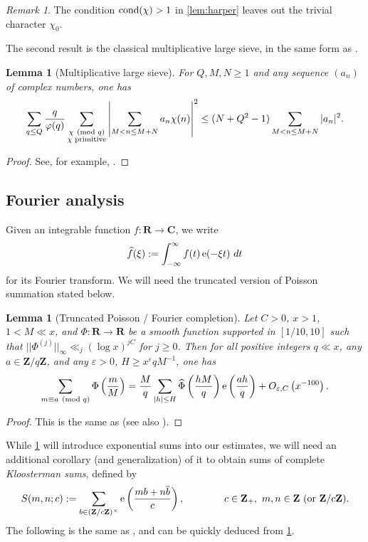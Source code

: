 \documentclass[reqno,11pt]{amsart}
\newtheorem{lemma}[theorem]{Lemma}
\theoremstyle{definition}
\theoremstyle{remark}
\newtheorem*{remark}{Remark}
\numberwithin{equation}{section}
\newcommand{\Z}{\mathbf{Z}}
\newcommand{\R}{\mathbf{R}}
\newcommand{\C}{\mathbf{C}}
\newcommand{\e}{\textnormal{e}}
\newcommand{\eps}{\varepsilon}
\renewcommand{\bar}{\overline}
\renewcommand{\hat}{\widehat}
\newcommand{\cond}{\textnormal{cond}}
\renewcommand{\pmod}[1]{\ (\textnormal{mod } #1)}
\begin{document}
\begin{remark}
The condition $\cond(\chi) > 1$ in \cref{lem:harper} leaves out the trivial character $\chi_0$.
\end{remark}

The second result is the classical multiplicative large sieve, in the same form as \cite[Lemme 6]{drappeau2015theoremes}.

\begin{lemma}[Multiplicative large sieve] \label{lem:large-sieve}
For $Q, M, N \ge 1$ and any sequence $(a_n)$ of complex numbers, one has
\[
    \sum_{q \le Q} \frac{q}{\varphi(q)} \sum_{\substack{\chi \pmod{q} \\ \chi \textnormal{ primitive}}} 
    \left\vert 
    \sum_{M < n \le M+N} a_n \chi(n)
    \right\vert^2
    \le 
    (N + Q^2 - 1) 
    \sum_{M < n \le M+N} |a_n|^2.
\]
\end{lemma}

\begin{proof}
See, for example, \cite[Theorem 7.13]{iwaniec2021analytic}. 
\end{proof}


\subsection{Fourier analysis}
Given an integrable function $f : \R \to \C$, we write
\[
    \hat{f}(\xi) := \int_{-\infty}^\infty f(t)\, \e(-\xi t)\ dt
\]
for its Fourier transform. We will need the truncated version of Poisson summation stated below.

\begin{lemma}[Truncated Poisson / Fourier completion] \label{lem:poisson}
Let $C > 0$, $x > 1$, $1 < M \ll x$, and $\Phi : \R \to \R$ be a smooth function supported in $[1/10, 10]$ such that $||\Phi^{(j)}||_\infty \ll_j (\log x)^{jC}$ for $j \ge 0$. Then for all positive integers $q \ll x$, any $a \in \Z/q\Z$, and any $\eps > 0$, $H \ge x^{\eps} qM^{-1}$, one has
\[
    \sum_{m \equiv a \pmod{q}} \Phi\left(\frac{m}{M}\right) = \frac{M}{q} \sum_{|h| \le H} \hat{\Phi} \left(\frac{hM}{q} \right) \e\left(\frac{ah}{q}\right)
    + 
    O_{\eps,C}\left(x^{-100}\right).
\]
\end{lemma}

\begin{proof}
This is the same as \cite[Lemma 13.4]{maynard2020primes} (see also \cite[Lemme 2]{drappeau2015theoremes}).
\end{proof}

While \cref{lem:poisson} will introduce exponential sums into our estimates, we will need an additional corollary (and generalization) of it to obtain sums of complete \emph{Kloosterman sums}, defined by
\[
    S(m, n; c) := \sum_{b \in (\Z/c\Z)^\times} 
    \e\left(\frac{mb + n\bar{b}}{c}\right),
    \qquad\qquad 
    c \in \Z_+,\ m, n \in \Z \textnormal{ (or $\Z/c\Z$)}.
\]
The following is the same as \cite[Lemma 13.5]{maynard2020primes}, and can be quickly deduced from \cref{lem:poisson}.
\end{document}

